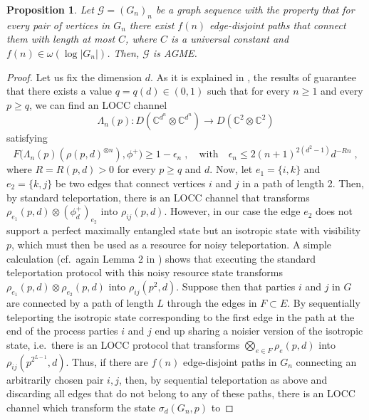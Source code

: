 \documentclass[a4paper,onecolumn,accepted=2024-12-14]{quantumarticle}
\newtheorem{proposition}[theorem]{Proposition}
\theoremstyle{plain}
\newcommand{\cG}{{\mathcal G}}         %
\newcommand{\C}{\mathbb{C}} %
\newcommand{\quadtext}[1]{\quad\text{#1}\quad}
\begin{document}
\begin{proposition}\label{prop:sufficientASGME}
Let $\cG=(G_n)_n$ be a graph sequence with the property that for every pair of vertices in $G_n$ there exist $f(n)$ edge-disjoint paths that connect them with length at most $C$, where $C$ is a universal constant and $f(n)\in\omega (\log |G_n|)$. Then,
$\cG$ is AGME.
\end{proposition}
\begin{proof}
Let us fix the dimension $d$. As it is explained in \cite[Lemma 2]{ASGME}, the results of \cite{hamada,devetakwinter} guarantee that there exists a value $q=q(d)\in (0,1)$ such that for every $n\geq 1$ and every $p\geq q$,
we can find an LOCC channel
\begin{equation}\Lambda_n(p)\colon D\left(\C^{d^n}\otimes \C^{d^n}\right)
\rightarrow D(\C^2\otimes \C^2)
\end{equation}
satisfying
\begin{equation}\label{eq:hamada}
F\big(\Lambda_n(p)(\rho(p,d)^{\otimes n}),\phi^+\big)\geq 1-\epsilon_n\;,
\quadtext{with}
\epsilon_n\leq2(n+1)^{2(d^2-1)}d^{-Rn}\;,
\end{equation}
where $R=R(p,d)>0$ for every $p\geq q$ and $d$.
Now, let $e_1=\{i,k\}$ and
$e_2=\{k,j\}$ be two edges that connect vertices $i$ and $j$ in a path of length 2. Then, by standard teleportation, there is an LOCC channel that transforms $\rho_{e_1}(p,d)\otimes(\phi^+_d)_{e_2}$ into $\rho_{ij}(p,d)$.
However, in our case the edge $e_2$ does not support a perfect maximally entangled state but an isotropic state with visibility $p$, which must then be used as a resource for noisy teleportation. A simple calculation (cf.\ again Lemma 2 in \cite{ASGME}) shows that executing the standard teleportation protocol with this noisy resource state transforms $\rho_{e_1}(p,d)\otimes\rho_{e_2}(p,d)$ into $\rho_{ij}(p^2,d)$. Suppose then that parties $i$ and $j$ in $G$ are connected by a path of length $L$ through the edges in $F\subset E$. By sequentially teleporting the isotropic state corresponding to the first edge in the path at the end of the process parties $i$ and $j$ end up sharing a noisier version of the isotropic state, i.e.\ there is an LOCC protocol that transforms $\bigotimes_{e\in F}\rho_e(p,d)$ into $\rho_{ij}(p^{2^{L-1}},d)$. Thus, if there are $f(n)$ edge-disjoint paths in $G_n$ connecting an arbitrarily chosen pair $i,j$, then, by sequential teleportation as above and discarding all edges that do not belong to any of these paths, there is an LOCC channel which transform the state  $\sigma_d(G_n,p)$ to

\end{proof}
\end{document}

